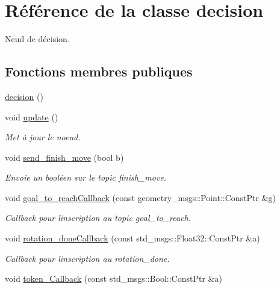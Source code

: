\hypertarget{classdecision}{}\section{Référence de la classe decision}
\label{classdecision}


Neud de décision.  


\subsection*{Fonctions membres publiques}
\begin{DoxyCompactItemize}
\item 
\hyperlink{classdecision_a00772c969f42d590e57f3eb37bafe6a6}{decision} ()
\item 
void \hyperlink{classdecision_a5fbd0cdaffc906d31560227560136b59}{update} ()
\begin{DoxyCompactList}\small\item\em Met à jour le noeud. \end{DoxyCompactList}\item 
void \hyperlink{classdecision_a1564bdf825aa8a746ec900279269de81}{send\+\_\+finish\+\_\+move} (bool b)
\begin{DoxyCompactList}\small\item\em Envoie un booléen sur le topic finish\+\_\+move. \end{DoxyCompactList}\item 
void \hyperlink{classdecision_afddf261c387d28dde5e6881343518ca7}{goal\+\_\+to\+\_\+reach\+Callback} (const geometry\+\_\+msgs\+::\+Point\+::\+Const\+Ptr \&g)
\begin{DoxyCompactList}\small\item\em Callback pour l\textquotesingle{}inscription au topic goal\+\_\+to\+\_\+reach. \end{DoxyCompactList}\item 
void \hyperlink{classdecision_ad6c2257e2304ad3a078d2b64cf425caa}{rotation\+\_\+done\+Callback} (const std\+\_\+msgs\+::\+Float32\+::\+Const\+Ptr \&a)
\begin{DoxyCompactList}\small\item\em Callback pour l\textquotesingle{}inscription au rotation\+\_\+done. \end{DoxyCompactList}\item 
void \hyperlink{classdecision_a7e0da40a27e1c320329a5b81f6044c57}{token\+\_\+\+Callback} (const std\+\_\+msgs\+::\+Bool\+::\+Const\+Ptr \&a)
\item 

\end{DoxyCompactItemize}
